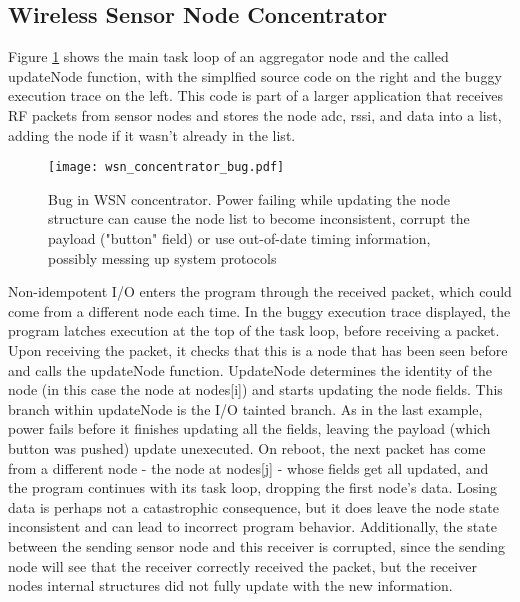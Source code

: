 \subsection{Wireless Sensor Node Concentrator}

Figure \ref{fig:wsn} shows the main task loop of an aggregator node and the called updateNode function, with the simplfied source code on the right and the buggy execution trace on the left. This code is part of a larger application that receives RF packets from sensor nodes and stores the node adc, rssi, and data into a list, adding the node if it wasn't already in the list. 

\begin{figure}[h]
\centering
\texttt{[image: wsn\_concentrator\_bug.pdf]}
\caption{Bug in WSN concentrator. Power failing while updating the node structure can cause the node list to become inconsistent, corrupt the payload ("button" field) or use out-of-date timing information, possibly messing up system protocols}
\label{fig:wsn}
\end{figure}

Non-idempotent I/O enters the program through the received packet, which could come from a different node each time. In the buggy execution trace displayed, the program latches execution at the top of the task loop, before receiving a packet. Upon receiving the packet, it checks that this is a node that has been seen before and calls the updateNode function. UpdateNode determines the identity of the node (in this case the node at nodes[i]) and starts updating the node fields. This branch within updateNode is the I/O tainted branch. As in the last example, power fails before it finishes updating all the fields, leaving the payload (which button was pushed) update unexecuted. On reboot, the next packet has come from a different node - the node at nodes[j] - whose fields get all updated, and the program continues with its task loop, dropping the first node's data. Losing data is perhaps not a catastrophic consequence, but it does leave the node state inconsistent and can lead to incorrect program behavior. Additionally, the state between the sending sensor node and this receiver is corrupted, since the sending node will see that the receiver correctly received the packet, but the receiver nodes internal structures did not fully update with the new information.


